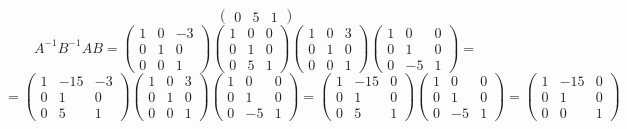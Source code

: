 \documentclass[12pt]{article}
\begin{document}
\begin{sloppypar}
\[\begin{pmatrix}
            0 & 5 & 1
        \end{pmatrix}
    \]
    \[
        A^{-1}B^{-1}AB =
        \begin{pmatrix}
            1 & 0 & -3 \\
            0 & 1 & 0  \\
            0 & 0 & 1
        \end{pmatrix}
        \begin{pmatrix}
            1 & 0 & 0 \\
            0 & 1 & 0 \\
            0 & 5 & 1
        \end{pmatrix}
        \begin{pmatrix}
            1 & 0 & 3 \\
            0 & 1 & 0 \\
            0 & 0 & 1
        \end{pmatrix}
        \begin{pmatrix}
            1 & 0  & 0 \\
            0 & 1  & 0 \\
            0 & -5 & 1
        \end{pmatrix}
        =
    \]
    \[
        =
        \begin{pmatrix}
            1 & -15 & -3 \\
            0 & 1   & 0  \\
            0 & 5   & 1
        \end{pmatrix}
        \begin{pmatrix}
            1 & 0 & 3 \\
            0 & 1 & 0 \\
            0 & 0 & 1
        \end{pmatrix}
        \begin{pmatrix}
            1 & 0  & 0 \\
            0 & 1  & 0 \\
            0 & -5 & 1
        \end{pmatrix}
        =
        \begin{pmatrix}
            1 & -15 & 0 \\
            0 & 1   & 0 \\
            0 & 5   & 1
        \end{pmatrix}
        \begin{pmatrix}
            1 & 0  & 0 \\
            0 & 1  & 0 \\
            0 & -5 & 1
        \end{pmatrix}
        =
        \begin{pmatrix}
            1 & -15 & 0 \\
            0 & 1   & 0 \\
            0 & 0   & 1
        \end{pmatrix}
    \]


\end{sloppypar}
\end{document}
